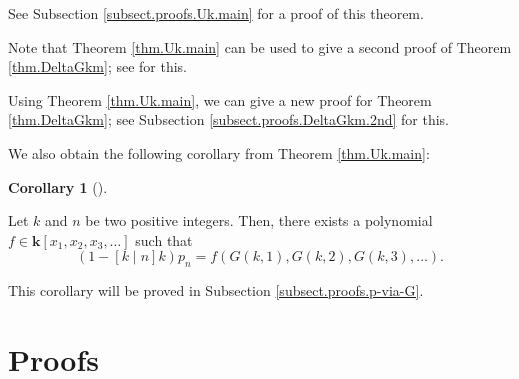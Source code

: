 \documentclass[numbers=enddot,12pt,final,onecolumn,notitlepage]{scrartcl}%
\theoremstyle{definition}
\newtheorem{coro}[theo]{Corollary}
\newenvironment{corollary}[1][]
{\begin{coro}[#1]\begin{leftbar}}
{\end{leftbar}\end{coro}}
\newenvironment{verlong}{}{}
\newenvironment{vershort}{}{}
\begin{document}
See Subsection \ref{subsect.proofs.Uk.main} for a proof of this theorem.

\begin{vershort}
Note that Theorem \ref{thm.Uk.main} can be used to give a second proof of
Theorem \ref{thm.DeltaGkm}; see \cite{verlong} for this.
\end{vershort}

\begin{verlong}
Using Theorem \ref{thm.Uk.main}, we can give a new proof for Theorem
\ref{thm.DeltaGkm}; see Subsection \ref{subsect.proofs.DeltaGkm.2nd} for this.
\end{verlong}

We also obtain the following corollary from Theorem \ref{thm.Uk.main}:

\begin{corollary}
\label{cor.p-via-G}Let $k$ and $n$ be two positive integers. Then, there
exists a polynomial $f\in\mathbf{k}\left[  x_{1},x_{2},x_{3},\ldots\right]  $
such that%
\begin{equation}
\left(  1-\left[  k\mid n\right]  k\right)  p_{n}=f\left(  G\left(
k,1\right)  ,G\left(  k,2\right)  ,G\left(  k,3\right)  ,\ldots\right)  .
\label{eq.cor.p-via-G.eq}%
\end{equation}

\end{corollary}

This corollary will be proved in Subsection \ref{subsect.proofs.p-via-G}.

\section{\label{sect.proofs}Proofs}
\end{document}

